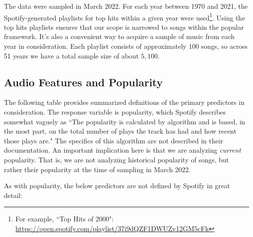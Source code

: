 \documentclass[12pt, twoside]{article}
\begin{document}
The data were sampled in March 2022. For each year between 1970 and 2021, the Spotify-generated playlists for top hits within a given year were used\footnote{For example, ``Top Hits of 2000": \href{https://open.spotify.com/playlist/37i9dQZF1DWUZv12GM5cFk}{https://open.spotify.com/playlist/37i9dQZF1DWUZv12GM5cFk}}. Using the top hits playlists ensures that our scope is narrowed to songs within the popular framework. It's also a convenient way to acquire a sample of music from each year in consideration. Each playlist consists of approximately $100$ songs, so across 51 years we have a total sample size of about $5,100$.

\subsection{Audio Features and Popularity}
The following table provides summarized definitions of the primary predictors in consideration. The response variable is popularity, which Spotify describes somewhat vaguely as ``The popularity is calculated by algorithm and is based, in the most part, on the total number of plays the track has had and how recent those plays are." The specifics of this algorithm are not described in their documentation. An important implication here is that we are analyzing \textit{current} popularity. That is, we are not analyzing historical popularity of songs, but rather their popularity at the time of sampling in March 2022.

As with popularity, the below predictors are not defined by Spotify in great detail:
\end{document}
